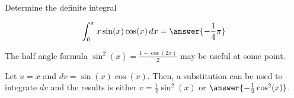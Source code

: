 \documentclass{ximera}
\author{Jason Miller}
\begin{document}
\begin{exercise}
Determine the definite integral 

\[
\int_0^{\pi} x\sin(x) \cos(x) \d x = \answer{-\frac{1}{4} \pi}
\]

The half angle formula $\sin^{2}(x)= \frac{1-\cos(2x)}{2}$ may be useful at some point. 

\begin{hint}
Let $u = x$ and $dv = \sin(x) \cos(x)$.  Then, a substitution can be used to integrate $dv$ and the results is either $v=\frac{1}{2} \sin^2(x)$ or $\answer{-\frac{1}{2} \cos^2(x)}$.

 
\end{hint}


\end{exercise}
\end{document}
